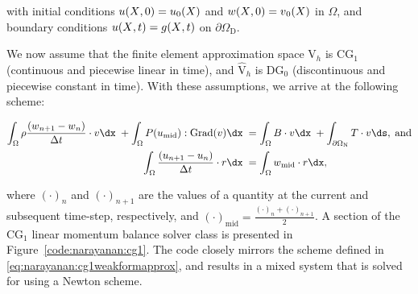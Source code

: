 \noindent with initial conditions $\mbox{$ u$}(\mbox{$ X$}, 0) = \mbox{$ u$}_{0}(\mbox{$ X$})$ and
$w(\mbox{$ X$}, 0) = \mbox{$ v$}_{0}(\mbox{$ X$})$ in $\Omega$, and boundary conditions
$\mbox{$ u$}(\mbox{$ X$}, t) = \mbox{$ g$}(\mbox{$ X$}, t)$ on $\partial\Omega_{\mathrm{D}}$.

We now assume that the finite element approximation space
$\mathrm{V}_{h}$ is CG$_{1}$ (continuous and piecewise linear in time),
and $\hat{\mathrm{V}}_{h}$ is DG$_{0}$ (discontinuous and piecewise
constant in time). With these assumptions, we arrive at the following
scheme:

\begin{equation}
\begin{split}
  \int_{\Omega} \rho \frac{\left(\bw_{n+1} - \bw_{n}\right)}{\Delta t} \cdot \bv \dx\;
  + \int_{\Omega} \bP(\bu_{\mathrm{mid}}):\mathrm{Grad}(\bv) \dx\;
  &=  \int_{\Omega} \bB \cdot \bv \dx\;
  +  \int_{\partial\Omega_{\mathrm{N}}} \bT \cdot \bv \ds,
  \; \mathrm{and}\\
    \int_{\Omega} \frac{\left(\bu_{n+1} - \bu_{n}\right)}{\Delta t} \cdot \br \dx\;
  &=  \int_{\Omega} \bw_{\mathrm{mid}} \cdot \br \dx,
\end{split}
\label{eq:narayanan:cg1weakformapprox}
\end{equation}

\noindent where $(\cdot)_{n}$ and $(\cdot)_{n+1}$ are the values of
a quantity at the current and subsequent time-step, respectively, and
$(\cdot)_{\mathrm{mid}} = \frac{(\cdot)_{n} +
  (\cdot)_{n+1}}{2}$.  A section of the CG$_{1}$ linear momentum balance
solver class is presented in Figure~\ref{code:narayanan:cg1}. The code
closely mirrors the scheme defined in
\eqref{eq:narayanan:cg1weakformapprox}, and results in a mixed system
that is solved for using a Newton scheme.

